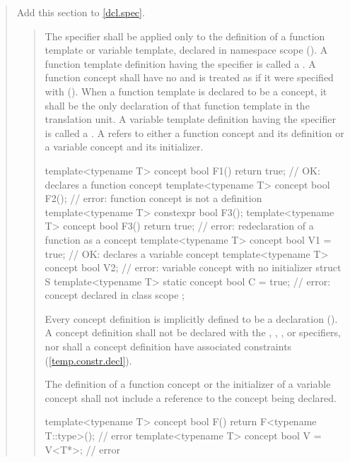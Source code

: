 \begin{quote}
\begin{xremovedblock}
Add this section to \ref{dcl.spec}.

\begin{quote}

\pnum
The  specifier shall be applied only to the 
definition of a function template or variable template, declared
in namespace scope ().
%
A function template definition having the 
specifier is called a . 
% 
A function concept shall have no  
and is treated as if it were specified with  
().
%
When a function template is declared to be a concept, it shall be the only
declaration of that function template in the translation unit.
%
A variable template definition having the  
specifier is called a .
%
A  refers to either a function concept 
and its definition or a variable concept and its initializer.
%
\enterexample
\begin{codeblock}
template<typename T> 
  concept bool F1() { return true; } // OK: declares a function concept
template<typename T> 
  concept bool F2();                 // error: function concept is not a definition
template<typename T> 
  constexpr bool F3();
template<typename T>
  concept bool F3() { return true; } // error: redeclaration of a function as a concept
template<typename T> 
  concept bool V1 = true;            // OK: declares a variable concept
template<typename T> 
  concept bool V2;                   // error: variable concept with no initializer
struct S {
  template<typename T> 
    static concept bool C = true;    // error: concept declared in class scope
};
\end{codeblock}
\exitexample

\pnum
Every concept definition is implicitly defined to be a 
 declaration ().
% 
A concept definition shall not be declared with the 
, , , or 
 specifiers, nor shall a concept definition have associated 
constraints (\ref{temp.constr.decl}).

\pnum
The definition of a function concept or the initializer of
a variable concept shall not include a reference to the concept being
declared.
%
\enterexample
\begin{codeblock}
template<typename T>
  concept bool F() { return F<typename T::type>(); } // error
template<typename T>
  concept bool V = V<T*>;                            // error
\end{codeblock}
\exitexample


\end{quote}
\end{xremovedblock}
\end{quote}
